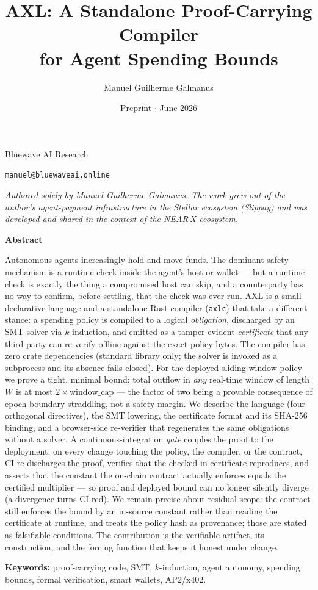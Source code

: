 \documentclass[11pt]{article}
\title{AXL: A Standalone Proof-Carrying Compiler\\ for Agent Spending Bounds}
\author{Manuel Guilherme Galmanus}
\date{Preprint $\cdot$ June 2026}
\makeatletter
\theoremstyle{plain}
\theoremstyle{definition}
\theoremstyle{remark}
\renewcommand{\maketitle}{%
  \begin{center}%
    {\LARGE\bfseries\@title\par}%
    \vspace{1.4em}%
    {\large\@author\par}%
    \vspace{0.35em}%
    {\normalsize Bluewave AI Research\par}%
    \vspace{0.15em}%
    {\normalsize\texttt{manuel@bluewaveai.online}\par}%
    \vspace{0.9em}%
    {\normalsize\@date\par}%
    \vspace{0.6em}%
    {\footnotesize\itshape
     Authored solely by Manuel Guilherme Galmanus. The work grew out of the
     author's agent-payment infrastructure in the Stellar ecosystem (Slippay)
     and was developed and shared in the context of the NEAR\,X ecosystem.\par}%
    \vspace{0.4em}%
  \end{center}%
  \vspace{0.6em}%
  \thispagestyle{plain}%
}
\renewenvironment{abstract}{%
  \vspace{0.4em}%
  \begin{center}\bfseries\normalsize Abstract\end{center}%
  \nopagebreak\par
  \begingroup
  \setlength{\leftskip}{2.2em}\setlength{\rightskip}{2.2em}%
  \small\noindent\ignorespaces
}{%
  \par\endgroup\vspace{1.0em}%
}
\makeatother
\begin{document}
\maketitle

\begin{abstract}
Autonomous agents increasingly hold and move funds. The dominant safety
mechanism is a runtime check inside the agent's host or wallet --- but a
runtime check is exactly the thing a compromised host can skip, and a
counterparty has no way to confirm, before settling, that the check was ever
run. AXL is a small declarative language and a standalone Rust compiler
(\texttt{axlc}) that take a different stance: a spending policy is compiled
to a logical \emph{obligation}, discharged by an SMT solver via $k$-induction,
and emitted as a tamper-evident \emph{certificate} that any third party can
re-verify offline against the exact policy bytes. The compiler has zero crate
dependencies (standard library only; the solver is invoked as a subprocess and
its absence fails closed). For the deployed sliding-window policy we prove a
tight, minimal bound: total outflow in \emph{any} real-time window of length
$W$ is at most $2\times\text{window\_cap}$ --- the factor of two being a
provable consequence of epoch-boundary straddling, not a safety margin. We
describe the language (four orthogonal directives), the SMT lowering, the
certificate format and its SHA-256 binding, and a browser-side re-verifier
that regenerates the same obligations without a solver. A
continuous-integration \emph{gate} couples the proof to the deployment: on every
change touching the policy, the compiler, or the contract, CI re-discharges the
proof, verifies that the checked-in certificate reproduces, and asserts that the
constant the on-chain contract actually enforces equals the certified
multiplier --- so proof and deployed bound can no longer silently diverge (a
divergence turns CI red). We remain precise about residual scope: the contract
still enforces the bound by an in-source constant rather than reading the
certificate at runtime, and treats the policy hash as provenance; those are
stated as falsifiable conditions. The contribution is the verifiable artifact,
its construction, and the forcing function that keeps it honest under change.
\par\vspace{0.6em}
\noindent\textbf{Keywords:} proof-carrying code, SMT, $k$-induction, agent
autonomy, spending bounds, formal verification, smart wallets, AP2/x402.
\end{abstract}
\end{document}
